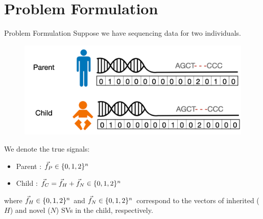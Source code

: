 \documentclass[10pt, t]{beamer}
\begin{document}

\section{Problem Formulation}
\begin{frame}{Problem Formulation}
Suppose we have sequencing data for two individuals. \\

\begin{figure}[h]
 	 	\includegraphics[width = .65\textwidth]{imgs/SVs.png}
\end{figure}
We denote the true signals:
\medskip
\begin{itemize}
    \item Parent : $ \vec{f}_P  \in \{0,1,2\}^n $
    \item Child : $\vec{f}_C = \vec{f}_H +\vec{f}_N \in \{0,1,2\}^{n}$
\end{itemize}
\medskip
where $\vec{f}_H \in \{0,1,2\}^n$ and $\vec{f}_N \in \{0,1,2\}^n$ correspond to the vectors of inherited ($H$) and novel ($N$) SVs in the child, respectively.
\end{frame}
\end{document}
